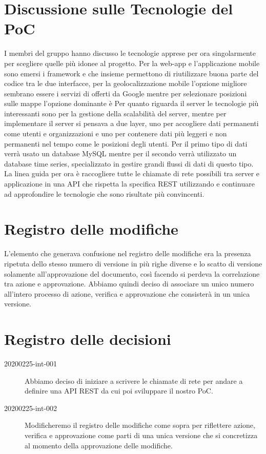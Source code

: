 \documentclass{article}
\begin{document}
\section{Discussione sulle Tecnologie del PoC}%
\label{sec:discussione_tecnologie_poc}
I membri del gruppo hanno discusso le tecnologie apprese per ora singolarmente per scegliere quelle più idonee al progetto.
Per la web-app e l'applicazione mobile sono emersi i framework  e  che insieme permettono di riutilizzare buona parte del codice tra le due interfacce, per la geolocalizzazione mobile l'opzione migliore sembrano essere i servizi di  offerti da Google mentre per selezionare posizioni sulle mappe l'opzione dominante è 
Per quanto riguarda il server le tecnologie più interessanti sono  per la gestione della scalabilità del server, mentre per implementare il server si pensava a due layer, uno per accogliere dati permanenti come utenti e organizzazioni e uno per contenere dati più leggeri e non permanenti nel tempo come le posizioni degli utenti.
Per il primo tipo di dati verrà usato un database MySQL mentre per il secondo verrà utilizzato un database time series, specializzato in gestire grandi flussi di dati di questo tipo.
La linea guida per ora è raccogliere tutte le chiamate di rete possibili tra server e applicazione in una API che rispetta la specifica REST utilizzando  e continuare ad approfondire le tecnologie che sono risultate più convincenti.

\section{Registro delle modifiche}%
\label{sec:registro_modifiche}
L'elemento che generava confusione nel registro delle modifiche era la presenza ripetuta dello stesso numero di versione in più righe diverse e lo scatto di versione solamente all'approvazione del documento, così facendo si perdeva la correlazione tra azione e approvazione.
Abbiamo quindi deciso di associare un unico numero all'intero processo di azione, verifica e approvazione che consisterà in un unica versione.

\newpage
\section{Registro delle decisioni}%
\label{sec:registro_delle_decisioni}

\begin{description}
  \item[20200225-int-001] Abbiamo deciso di iniziare a scrivere le chiamate di rete per andare a definire una API REST da cui poi sviluppare il nostro PoC.
  \item[20200225-int-002] Modificheremo il registro delle modifiche come sopra per riflettere azione, verifica e approvazione come parti di una unica versione che si concretizza al momento della approvazione delle modifiche.
\end{description}

\end{document}
